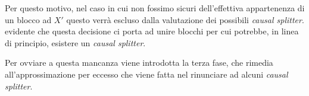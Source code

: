 Per questo motivo, nel caso in cui non fossimo sicuri dell'effettiva appartenenza di un blocco ad $X'$ questo verrà escluso dalla valutazione dei possibili \emph{causal splitter}. \accente evidente che questa decisione ci porta ad unire blocchi per cui potrebbe, in linea di principio, esistere un \emph{causal splitter}.

Per ovviare a questa mancanza viene introdotta la terza fase, che rimedia all'approssimazione per eccesso che viene fatta nel rinunciare ad alcuni \emph{causal splitter}.

